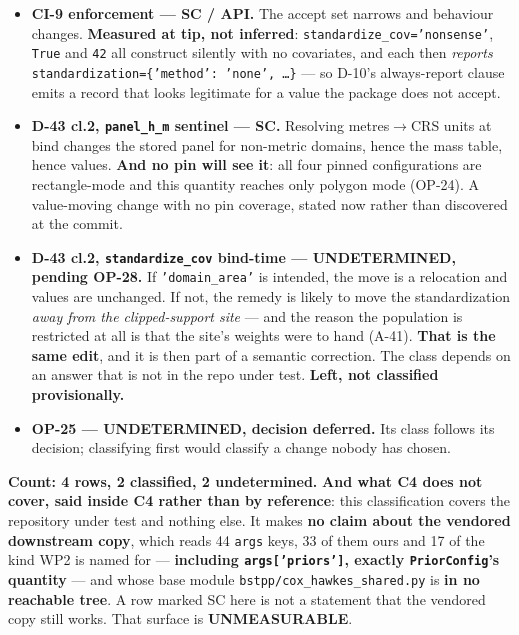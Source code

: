 \documentclass[
  10pt,
]{article}
\providecommand{\tightlist}{%
  \setlength{\itemsep}{0pt}\setlength{\parskip}{0pt}}
\begin{document}
\begin{itemize}
\tightlist
\item \textbf{CI-9 enforcement --- SC / API.} The accept set narrows and behaviour changes. \textbf{Measured at tip, not inferred}: \texttt{standardize\_cov='nonsense'}, \texttt{True} and \texttt{42} all construct silently with no covariates, and each then \emph{reports} \texttt{standardization=\{'method': 'none', \dots\}} --- so D-10's always-report clause emits a record that looks legitimate for a value the package does not accept.
\item \textbf{D-43 cl.2, \texttt{panel\_h\_m} sentinel --- SC.} Resolving metres$\rightarrow$CRS units at bind changes the stored panel for non-metric domains, hence the mass table, hence values. \textbf{And no pin will see it}: all four pinned configurations are rectangle-mode and this quantity reaches only polygon mode (OP-24). A value-moving change with no pin coverage, stated now rather than discovered at the commit.
\item \textbf{D-43 cl.2, \texttt{standardize\_cov} bind-time --- UNDETERMINED, pending OP-28.} If \texttt{'domain\_area'} is intended, the move is a relocation and values are unchanged. If not, the remedy is likely to move the standardization \emph{away from the clipped-support site} --- and the reason the population is restricted at all is that the site's weights were to hand (A-41). \textbf{That is the same edit}, and it is then part of a semantic correction. The class depends on an answer that is not in the repo under test. \textbf{Left, not classified provisionally.}
\item \textbf{OP-25 --- UNDETERMINED, decision deferred.} Its class follows its decision; classifying first would classify a change nobody has chosen.
\end{itemize}

\textbf{Count: 4 rows, 2 classified, 2 undetermined.} \textbf{And what C4 does not cover, said inside C4 rather than by reference}: this classification covers the repository under test and nothing else. It makes \textbf{no claim about the vendored downstream copy}, which reads 44 \texttt{args} keys, 33 of them ours and 17 of the kind WP2 is named for --- \textbf{including \texttt{args['priors']}, exactly \texttt{PriorConfig}'s quantity} --- and whose base module \texttt{bstpp/\allowbreak{}cox\_hawkes\_shared.py} is \textbf{in no reachable tree}. A row marked SC here is not a statement that the vendored copy still works. That surface is \textbf{UNMEASURABLE}.
\end{document}
